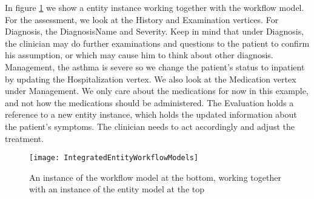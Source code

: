 In figure \ref{fig:IntegratedEntityWorkflowModels} we show a entity instance working together with the workflow model. For the assessment, we look at the History and Examination vertices. For Diagnosis, the DiagnosisName and Severity. Keep in mind that under Diagnosis, the clinician may do further examinations and questions to the patient to confirm his assumption, or which may cause him to think about other diagnosis. Management, the asthma is severe so we change the patient's status to inpatient by updating the Hospitalization vertex. We also look at the Medication vertex under Management. We only care about the medications for now in this example, and not how the medications should be administered. The Evaluation holds a reference to a new entity instance, which holds the updated information about the patient's symptoms. The clinician needs to act accordingly and adjust the treatment.

\begin{figure}[h!]
	\label{fig:IntegratedEntityWorkflowModels}
	\texttt{[image: IntegratedEntityWorkflowModels]}
		\caption {An instance of the workflow model at the bottom, working together with an instance of the entity model at the top}
\end{figure}